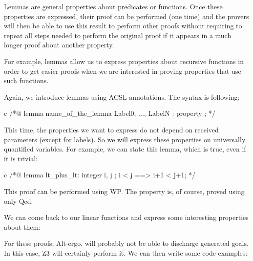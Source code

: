 Lemmas are general properties about predicates or functions. Once these
properties are expressed, their proof can be performed (one time) and
the provers will then be able to use this result to perform other proofs
without requiring to repeat all steps needed to perform the
original proof if it appears in a much longer proof about another
property.




For example, lemmas allow us to express properties about recursive
functions in order to get easier proofs when we are interested in
proving properties that use such functions.





Again, we introduce lemmas using ACSL annotations. The syntax is
following:



\begin{CodeBlock}{c}
/*@
  lemma name_of_the_lemma { Label0, ..., LabelN }:
    property ;
*/
\end{CodeBlock}



This time, the properties we want to express do not depend on received
parameters (except for labels). So we will express these properties on
universally quantified variables. For example, we can state this lemma,
which is true, even if it is trivial:



\begin{CodeBlock}{c}
/*@
  lemma lt_plus_lt:
    \forall integer i, j ; i < j ==> i+1 < j+1;
*/
\end{CodeBlock}



This proof can be performed using WP. The property is, of course, proved
using only Qed.





We can come back to our linear functions and express some interesting
properties about them:






For these proofs, Alt-ergo, will probably not be able to discharge
generated goals. In this case, Z3 will certainly perform it. We can then
write some code examples:



